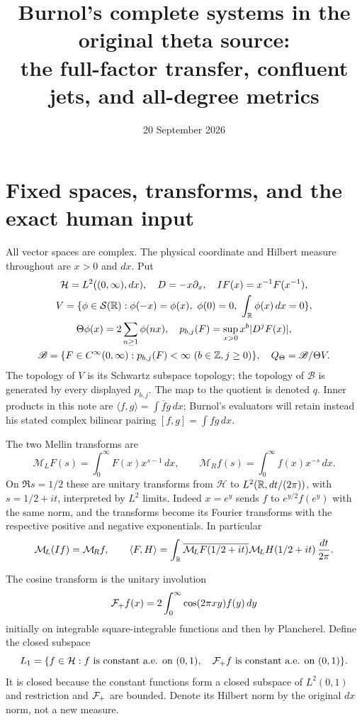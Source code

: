 \documentclass[11pt]{article}
\title{Burnol's complete systems in the original theta source:\\
the full-factor transfer, confluent jets, and all-degree metrics}
\author{}
\date{20 September 2026}
\newcommand{\B}{\mathscr B}\newcommand{\HH}{\mathcal H}
\newcommand{\ML}{\mathcal M_{\!L}}\newcommand{\MR}{\mathcal M_{\!R}}
\begin{document}
\maketitle

\section{Fixed spaces, transforms, and the exact human input}

All vector spaces are complex. The physical coordinate and Hilbert
measure throughout are $x>0$ and $dx$. Put
\begin{equation}\label{eq:objects}
\begin{gathered}
 \HH=L^2((0,\infty),dx),\quad D=-x\partial_x,\quad
 IF(x)=x^{-1}F(x^{-1}),\\
 V=\{\phi\in\mathcal S(\R):\phi(-x)=\phi(x),\ 
       \phi(0)=0,\ \int_\R\phi(x)\,dx=0\},\\
 \Theta\phi(x)=2\sum_{n\geq1}\phi(nx),\quad
 p_{b,j}(F)=\sup_{x>0}x^b|D^jF(x)|,\\
 \B=\{F\in C^\infty(0,\infty):p_{b,j}(F)<\infty
                          \ (b\in\mathbb Z,j\geq0)\},
 \quad Q_\Theta=\B/\Theta V.
\end{gathered}
\end{equation}
The topology of $V$ is its Schwartz subspace topology; the topology
of $\B$ is generated by every displayed $p_{b,j}$. The map to the
quotient is denoted $q$. Inner products in this note are
$\langle f,g\rangle=\int\overline f g\,dx$; Burnol's evaluators will
retain instead his stated complex bilinear pairing
$[f,g]=\int fg\,dx$.

The two Mellin transforms are
\begin{equation}\label{eq:mellin}
 \ML F(s)=\int_0^\infty F(x)x^{s-1}\,dx,\qquad
 \MR f(s)=\int_0^\infty f(x)x^{-s}\,dx.
\end{equation}
On $\Re s=1/2$ these are unitary transforms from $\HH$ to
$L^2(\mathbb R,dt/(2\pi))$, with $s=1/2+it$, interpreted by $L^2$
limits. Indeed $x=e^y$ sends $f$ to $e^{y/2}f(e^y)$ with the same
norm, and the transforms become its Fourier transforms with the
respective positive and negative exponentials. In particular
\begin{equation}\label{eq:parseval}
 \ML(If)=\MR f,\qquad
 \langle F,H\rangle=\int_\R
       \overline{\ML F(1/2+it)}\ML H(1/2+it)\,\frac{dt}{2\pi}.
\end{equation}

The cosine transform is the unitary involution
\[
 \mathcal F_+ f(x)=2\int_0^\infty\cos(2\pi xy)f(y)\,dy
\]
initially on integrable square-integrable functions and then by
Plancherel. Define the closed subspace
\[
 L_1=\{f\in\HH:f\text{ is constant a.e. on }(0,1),\quad
                      \Fc f\text{ is constant a.e. on }(0,1)\}.
\]
It is closed because the constant functions form a closed subspace
of $L^2(0,1)$ and restriction and $\mathcal F_+$ are bounded. Denote its
Hilbert norm by the original $dx$ norm, not a new measure.
\end{document}
